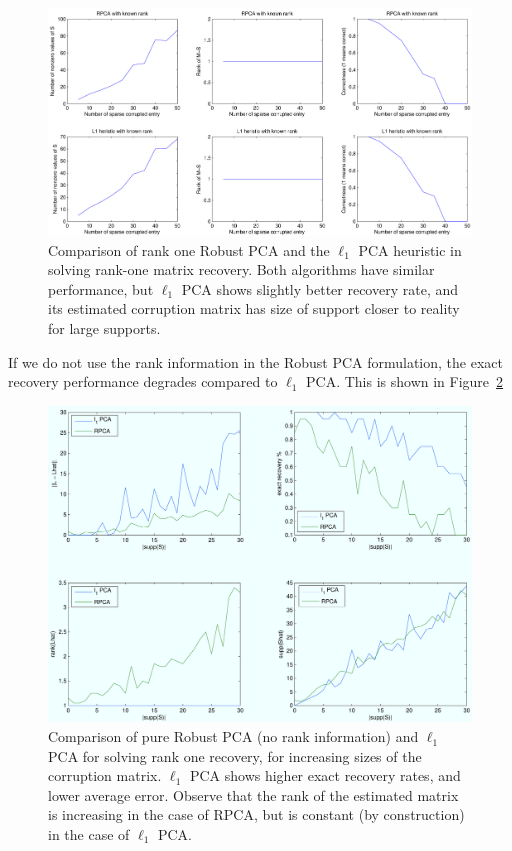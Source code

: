 \begin{figure}[h!]
\centering
\includegraphics[width=\textwidth]{../figures/compare.pdf}
\caption{Comparison of rank one Robust PCA and the $\ell_1$ PCA heuristic in solving rank-one matrix recovery. Both algorithms have similar performance, but $\ell_1$ PCA shows slightly better recovery rate, and its estimated corruption matrix has size of support closer to reality for large supports.}
\label{fig:l1pca_vs_rankone_rpca}
\end{figure}

If we do not use the rank information in the Robust PCA formulation, the exact recovery performance degrades compared to $\ell_1$ PCA. This is shown in Figure~\ref{fig:l1pca_vs_pure_rpca}

\begin{figure}[h!]
\centering
\includegraphics[width=\textwidth]{../figures/l1pca_rk1_rpca_vs_l1pca.pdf}
\caption{Comparison of pure Robust PCA (no rank information) and $\ell_1$ PCA for solving rank one recovery, for increasing sizes of the corruption matrix. $\ell_1$ PCA shows higher exact recovery rates, and lower average error. Observe that the rank of the estimated matrix is increasing in the case of RPCA, but is constant (by construction) in the case of $\ell_1$ PCA.}
\label{fig:l1pca_vs_pure_rpca}
\end{figure}


